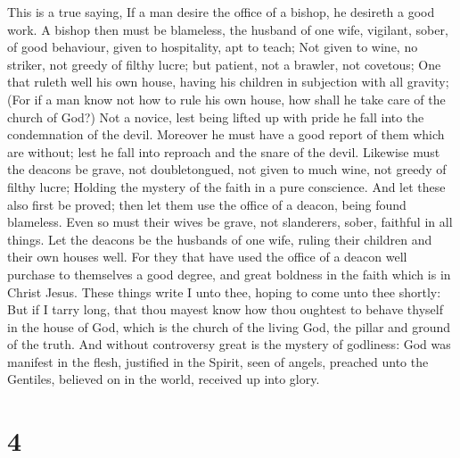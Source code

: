  This is a true saying, If a man desire the office of a
bishop, he desireth a good work.  A bishop then must be
blameless, the husband of one wife, vigilant, sober, of good behaviour,
given to hospitality, apt to teach;  Not given to wine, no
striker, not greedy of filthy lucre; but patient, not a brawler, not
covetous;  One that ruleth well his own house, having his
children in subjection with all gravity;  (For if a man
know not how to rule his own house, how shall he take care of the church
of God?)  Not a novice, lest being lifted up with pride he
fall into the condemnation of the devil.  Moreover he must
have a good report of them which are without; lest he fall into reproach
and the snare of the devil.  Likewise must the deacons be
grave, not doubletongued, not given to much wine, not greedy of filthy
lucre;  Holding the mystery of the faith in a pure
conscience.  And let these also first be proved; then let
them use the office of a deacon, being found blameless. 
Even so must their wives be grave, not slanderers, sober, faithful in
all things.  Let the deacons be the husbands of one wife,
ruling their children and their own houses well.  For
they that have used the office of a deacon well purchase to themselves a
good degree, and great boldness in the faith which is in Christ Jesus.
 These things write I unto thee, hoping to come unto thee
shortly:  But if I tarry long, that thou mayest know how
thou oughtest to behave thyself in the house of God, which is the church
of the living God, the pillar and ground of the truth. 
And without controversy great is the mystery of godliness: God was
manifest in the flesh, justified in the Spirit, seen of angels, preached
unto the Gentiles, believed on in the world, received up into glory.

\hypertarget{section-3}{%
\section{4}\label{section-3}}

